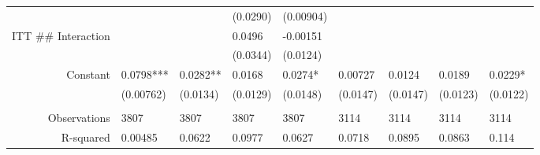 \begin{tabular}{rrrrrrrrr}
      & \multicolumn{1}{l}{} & \multicolumn{1}{l}{} & \multicolumn{1}{l}{(0.0290)} & \multicolumn{1}{l}{(0.00904)} & \multicolumn{1}{l}{} & \multicolumn{1}{l}{} & \multicolumn{1}{l}{} & \multicolumn{1}{l}{} \\
ITT \#\# Interaction & \multicolumn{1}{l}{} & \multicolumn{1}{l}{} & \multicolumn{1}{l}{0.0496} & \multicolumn{1}{l}{-0.00151} & \multicolumn{1}{l}{} & \multicolumn{1}{l}{} & \multicolumn{1}{l}{} & \multicolumn{1}{l}{} \\
      & \multicolumn{1}{l}{} & \multicolumn{1}{l}{} & \multicolumn{1}{l}{(0.0344)} & \multicolumn{1}{l}{(0.0124)} & \multicolumn{1}{l}{} & \multicolumn{1}{l}{} & \multicolumn{1}{l}{} & \multicolumn{1}{l}{} \\
Constant & \multicolumn{1}{l}{0.0798***} & \multicolumn{1}{l}{0.0282**} & \multicolumn{1}{l}{0.0168} & \multicolumn{1}{l}{0.0274*} & \multicolumn{1}{l}{0.00727} & \multicolumn{1}{l}{0.0124} & \multicolumn{1}{l}{0.0189} & \multicolumn{1}{l}{0.0229*} \\
      & \multicolumn{1}{l}{(0.00762)} & \multicolumn{1}{l}{(0.0134)} & \multicolumn{1}{l}{(0.0129)} & \multicolumn{1}{l}{(0.0148)} & \multicolumn{1}{l}{(0.0147)} & \multicolumn{1}{l}{(0.0147)} & \multicolumn{1}{l}{(0.0123)} & \multicolumn{1}{l}{(0.0122)} \\
      & \multicolumn{1}{l}{} & \multicolumn{1}{l}{} & \multicolumn{1}{l}{} & \multicolumn{1}{l}{} & \multicolumn{1}{l}{} & \multicolumn{1}{l}{} & \multicolumn{1}{l}{} & \multicolumn{1}{l}{} \\
      \midrule
Observations & \multicolumn{1}{l}{3807} & \multicolumn{1}{l}{3807} & \multicolumn{1}{l}{3807} & \multicolumn{1}{l}{3807} & \multicolumn{1}{l}{3114} & \multicolumn{1}{l}{3114} & \multicolumn{1}{l}{3114} & \multicolumn{1}{l}{3114} \\
R-squared & \multicolumn{1}{l}{0.00485} & \multicolumn{1}{l}{0.0622} & \multicolumn{1}{l}{0.0977} & \multicolumn{1}{l}{0.0627} & \multicolumn{1}{l}{0.0718} & \multicolumn{1}{l}{0.0895} & \multicolumn{1}{l}{0.0863} & \multicolumn{1}{l}{0.114} \\
\bottomrule
\end{tabular}%
